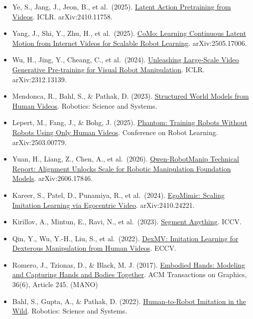 \begin{itemize}
  Yang, R., Yu, Q., Wu, Y., et al.~(2025). \href{https://arxiv.org/abs/2507.12440}{EgoVLA: Learning Vision-Language-Action Models from Egocentric Human Videos}. arXiv:2507.12440.
\item
  Ye, S., Jang, J., Jeon, B., et al.~(2025). \href{https://openreview.net/forum?id=VYOe2eBQeh}{Latent Action Pretraining from Videos}. ICLR. arXiv:2410.11758.
\item
  Yang, J., Shi, Y., Zhu, H., et al.~(2025). \href{https://arxiv.org/abs/2505.17006}{CoMo: Learning Continuous Latent Motion from Internet Videos for Scalable Robot Learning}. arXiv:2505.17006.
\item
  Wu, H., Jing, Y., Cheang, C., et al.~(2024). \href{https://openreview.net/forum?id=NxoFmGgWC9}{Unleashing Large-Scale Video Generative Pre-training for Visual Robot Manipulation}. ICLR. arXiv:2312.13139.
\item
  Mendonca, R., Bahl, S., \& Pathak, D. (2023). \href{https://arxiv.org/abs/2308.10901}{Structured World Models from Human Videos}. Robotics: Science and Systems.
\item
  Lepert, M., Fang, J., \& Bohg, J. (2025). \href{https://proceedings.mlr.press/v305/lepert25a.html}{Phantom: Training Robots Without Robots Using Only Human Videos}. Conference on Robot Learning. arXiv:2503.00779.
\item
  Yuan, H., Liang, Z., Chen, A., et al.~(2026). \href{https://arxiv.org/abs/2606.17846}{Qwen-RobotManip Technical Report: Alignment Unlocks Scale for Robotic Manipulation Foundation Models}. arXiv:2606.17846.
\item
  Kareer, S., Patel, D., Punamiya, R., et al.~(2024). \href{https://arxiv.org/abs/2410.24221}{EgoMimic: Scaling Imitation Learning via Egocentric Video}. arXiv:2410.24221.
\item
  Kirillov, A., Mintun, E., Ravi, N., et al.~(2023). \href{https://openaccess.thecvf.com/content/ICCV2023/html/Kirillov_Segment_Anything_ICCV_2023_paper.html}{Segment Anything}. ICCV.
\item
  Qin, Y., Wu, Y.-H., Liu, S., et al.~(2022). \href{https://arxiv.org/abs/2108.05877}{DexMV: Imitation Learning for Dexterous Manipulation from Human Videos}. ECCV.
\item
  Romero, J., Tzionas, D., \& Black, M. J. (2017). \href{https://doi.org/10.1145/3130800.3130883}{Embodied Hands: Modeling and Capturing Hands and Bodies Together}. ACM Transactions on Graphics, 36(6), Article 245. (MANO)
\item
  Bahl, S., Gupta, A., \& Pathak, D. (2022). \href{https://arxiv.org/abs/2207.09450}{Human-to-Robot Imitation in the Wild}. Robotics: Science and Systems.

\end{itemize}
